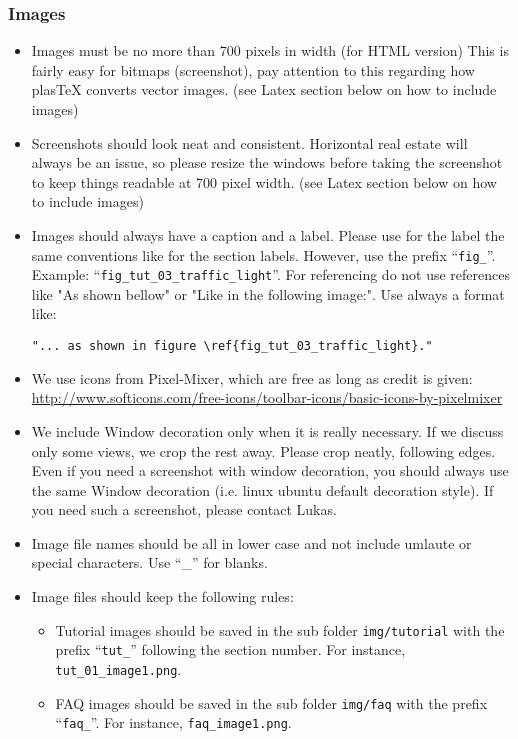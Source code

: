 \subsubsection{Images}
\begin{itemize}
	\item Images must be no more than 700 pixels in width (for HTML version)  This is fairly easy for bitmaps (screenshot), pay attention to this regarding how plasTeX converts vector images. (see Latex section below on how to include images)

    \item Screenshots should look neat and consistent.  Horizontal real estate will always be an issue, so please resize the windows before taking the screenshot to keep things readable at 700 pixel width.  (see Latex section below on how to include images)

	\item Images should always have a caption and a label. Please use for the label the same conventions like for the section labels. However, use the prefix ``\texttt{fig\_}''. Example: ``\texttt{fig\_tut\_03\_traffic\_light}''. For referencing do not use references like "As shown bellow" or "Like in the following image:". Use always a format like:

\begin{verbatim}"... as shown in figure \ref{fig_tut_03_traffic_light}."\end{verbatim}

	\item We use icons from Pixel-Mixer, which are free as long as credit is given: \url{http://www.softicons.com/free-icons/toolbar-icons/basic-icons-by-pixelmixer}

  \item We include Window decoration only when it is really necessary.  If we discuss only some views, we crop the rest away.  Please crop neatly, following edges. Even if you need a screenshot with window decoration, you should always use the same Window decoration (i.e. linux ubuntu default decoration style). If you need such a screenshot, please contact Lukas.

  \item Image file names should be all in lower case and not include umlaute or special characters. Use ``\_'' for blanks.

  \item Image files should keep the following rules:
	
\begin{itemize}
		\item Tutorial images should be saved in the sub folder \texttt{img/tutorial} with the prefix ``\texttt{tut\_}'' following the section number. For instance, \texttt{tut\_01\_image1.png}.

		\item FAQ images should be saved in the sub folder \texttt{img/faq} with the prefix ``\texttt{faq\_}''. For instance, \texttt{faq\_image1.png}.

	\end{itemize} 
	\end{itemize} 

